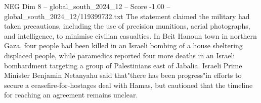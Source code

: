 \begin{textsample}{NEG Dim 8 – global\_south\_2024\_12 – Score -1.00 – global\_south\_2024\_12/119399732.txt}
The statement claimed the military had taken precautions, including the use of precision munitions, aerial photographs, and intelligence, to minimise civilian casualties.
In Beit Hanoun town in northern Gaza, four people had been killed in an Israeli bombing of a house sheltering displaced people, while paramedics reported four more deaths in an Israeli bombardment targeting a group of Palestinians east of Jabalia.
Israeli Prime Minister Benjamin Netanyahu said that"there has been progress"in efforts to secure a ceasefire-for-hostages deal with Hamas, but cautioned that the timeline for reaching an agreement remains unclear.

\end{textsample}
